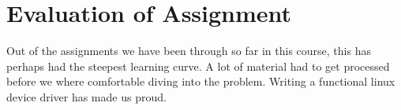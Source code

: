 \section{Evaluation of Assignment}
Out of the assignments we have been through so far in this course, this has perhaps had the steepest learning curve. A lot of material had to get processed before we where comfortable diving into the problem. Writing a functional linux device driver has made us proud.  
